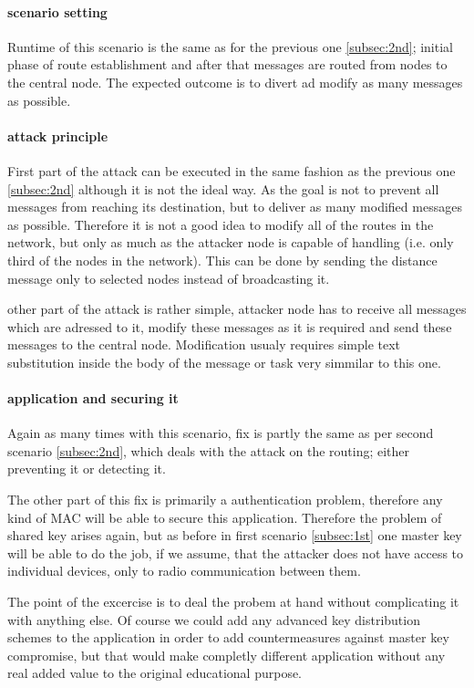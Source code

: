 \documentclass[
  digital, %
  table,   %
  nolof,     %
  nolot,     %
           oneside
]{fithesis3}
\begin{document}
    \paragraph{scenario setting}
    Runtime of this scenario is the same as for the previous one \ref{subsec:2nd}; initial phase of route establishment and after that messages are routed from nodes to the central node. The expected outcome is to divert ad modify as many messages as possible.

    \paragraph{attack principle}
    First part of the attack can be executed in the same fashion as the previous one \ref{subsec:2nd} although it is not the ideal way. As the goal is not to prevent all messages from reaching its destination, but to deliver as many modified messages as possible. Therefore it is not a good idea to modify all of the routes in the network, but only as much as the attacker node is capable of handling (i.e. only third of the nodes in the network). This can be done by sending the distance message only to selected nodes instead of broadcasting it.

    other part of the attack is rather simple, attacker node has to receive all messages which are adressed to it, modify these messages as it is required and send these messages to the central node. Modification usualy requires simple text substitution inside the body of the message or task very simmilar to this one.

    \paragraph{application and securing it}
    Again as many times with this scenario, fix is partly the same as per second scenario \ref{subsec:2nd}, which deals with the attack on the routing; either preventing it or detecting it.

    The other part of this fix is primarily a authentication problem, therefore any kind of MAC will be able to secure this application. Therefore the problem of shared key arises again, but as before in first scenario \ref{subsec:1st} one master key will be able to do the job, if we assume, that the attacker does not have access to individual devices, only to radio communication between them.

    The point of the excercise is to deal the probem at hand without complicating it with anything else. Of course we could add any advanced key distribution schemes to the application in order to add countermeasures against master key compromise, but that would make completly different application without any real added value to the original educational purpose. 
\end{document}
